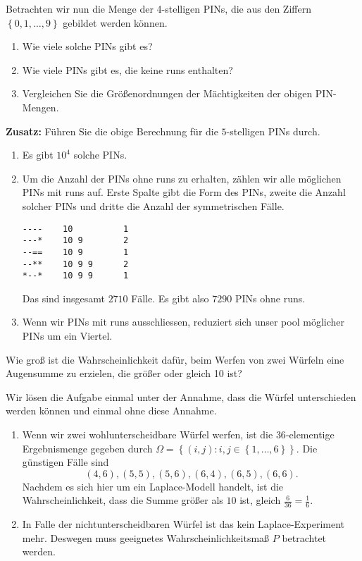 Betrachten wir nun die Menge der 4-stelligen PINs, die aus den Ziffern $\left\{
0,1, \dots, 9 \right\}$ gebildet werden können. 
\begin{enumerate}
    \item Wie viele solche PINs gibt es?
    \item Wie viele PINs gibt es, die keine runs enthalten?
    \item Vergleichen Sie die Größenordnungen der Mächtigkeiten der obigen
        PIN-Mengen. 
\end{enumerate}
\textbf{Zusatz:} Führen Sie die obige Berechnung für die $5$-stelligen PINs durch.

\solution
\begin{enumerate}
    \item Es gibt $10^4$ solche PINs.
    \item Um die Anzahl der PINs ohne runs zu erhalten, zählen wir alle
        möglichen PINs mit runs auf. Erste Spalte gibt die Form des PINs,
        zweite die Anzahl solcher PINs und dritte die Anzahl der symmetrischen
        Fälle.
\begin{lstlisting}
----    10          1
---*    10 9        2
--==    10 9        1
--**    10 9 9      2
*--*    10 9 9      1
\end{lstlisting}
        Das sind insgesamt $2710$ Fälle. Es gibt also $7290$ PINs ohne runs.
    \item Wenn wir PINs mit runs ausschliessen, reduziert sich unser pool
        möglicher PINs um ein Viertel. 
\end{enumerate}


Wie groß ist die Wahrscheinlichkeit dafür, beim Werfen von zwei Würfeln eine
Augensumme zu erzielen, die größer oder gleich 10 ist?

\solution Wir lösen die Aufgabe einmal unter der Annahme, dass die Würfel
unterschieden werden können und einmal ohne diese Annahme. 
\begin{enumerate}
    \item Wenn wir zwei wohlunterscheidbare Würfel werfen, ist die
        $36$-elementige Ergebnismenge gegeben durch $\Omega = \left\{ (i,j) :
        i,j \in \left\{ 1, \dots, 6 \right\} \right\}$. Die günstigen Fälle
        sind 
        \begin{equation}
            (4,6), (5,5), (5,6), (6,4), (6,5), (6,6).
        \end{equation}
        Nachdem es sich hier um ein Laplace-Modell handelt, ist die
        Wahrscheinlichkeit, dass die Summe größer als $10$ ist, gleich
        $\frac{6}{36}= \frac{1}{6}$.

    \item In Falle der nichtunterscheidbaren Würfel ist das kein
        Laplace-Experiment mehr. Deswegen muss geeignetes
        Wahrscheinlichkeitsmaß $P$ betrachtet werden. 
\end{enumerate}


